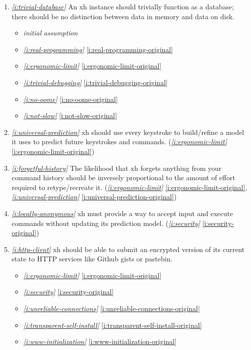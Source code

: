 \documentclass{report}
\makeatletter
\newcommand*{\Label}[2]{%
  \@bsphack
  \begingroup
    \label{#1-original}%
    \def\@currentlabel{#2}%
    \label{#1}%
  \endgroup
  \@esphack
}
\newcommand{\initial}{{\em initial assumption}}
\newcommand{\refboth}[1]{{\em \ref{#1}} \ref{#1-original}}
\makeatother
\begin{document}
\begin{enumerate}
  trivially obvious.
\begin{itemize}
\item \initial
\item \refboth{i:real-programming}
\item \refboth{i:distributed-computation}
\item \refboth{i:ergonomic-limit}
\end{itemize}
\item{}\Label{i:trivial-database}{database}{\em\ref{i:trivial-database}}
  An xh instance should trivially function as a database; there should be
  no distinction between data in memory and data on disk.
\begin{itemize}
\item \initial
\item \refboth{i:real-programming}
\item \refboth{i:ergonomic-limit}
\item \refboth{i:trivial-debugging}
\item \refboth{i:no-oome}
\item \refboth{i:not-slow}
\end{itemize}

\item{}\Label{i:universal-prediction}{prediction}{\em\ref{i:universal-prediction}}
  xh should use every keystroke to build/refine a model it uses to predict
  future keystrokes and commands.
(\refboth{i:ergonomic-limit})
\item{}\Label{i:forgetful-history}{history}{\em\ref{i:forgetful-history}}
  The likelihood that xh forgets anything from your command history should
  be inversely proportional to the amount of effort required to
  retype/recreate it.
(\refboth{i:ergonomic-limit}, \refboth{i:universal-prediction})
\item{}\Label{i:locally-anonymous}{anonymous}{\em\ref{i:locally-anonymous}}
  xh must provide a way to accept input and execute commands without
  updating its prediction model.
(\refboth{i:security})
\item{}\Label{i:http-client}{pastebin}{\em\ref{i:http-client}}
  xh should be able to submit an encrypted version of its current state to
  HTTP services like Github gists or pastebin.
\begin{itemize}
\item \refboth{i:ergonomic-limit}
\item \refboth{i:security}
\item \refboth{i:unreliable-connections}
\item \refboth{i:transparent-self-install}
\item \refboth{i:www-initialization}
\end{itemize}


\end{enumerate}
\end{document}

